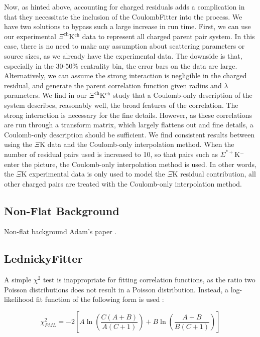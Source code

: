 \documentclass[ALICE,manyauthors]{cernphprep}
\begin{document}
Now, as hinted above, accounting for charged residuals adds a complication in that they necessitate the inclusion of the CoulombFitter into the process.  We have two solutions to bypass such a large increase in run time.  First, we can use our experimental $\Xi^{\mathrm{ch}}$K$^{\mathrm{ch}}$ data to represent all charged parent pair system.  In this case, there is no need to make any assumption about scattering parameters or source sizes, as we already have the experimental data.  The downside is that, especially in the 30-50\% centrality bin, the error bars on the data are large.  Alternatively, we can assume the strong interaction is negligible in the charged residual, and generate the parent correlation function given radius and $\lambda$ parameters.  We find in our $\Xi^{\mathrm{ch}}$K$^{\mathrm{ch}}$ study that a Coulomb-only description of the system describes, reasonably well, the broad features of the correlation.  The strong interaction is necessary for the fine details.  However, as these correlations are run through a transform matrix, which largely flattens out and fine details, a Coulomb-only description should be sufficient.  We find consistent results between using the $\Xi$K data and the Coulomb-only interpolation method.  When the number of residual pairs used is increased to 10, so that pairs such as $\Sigma^{*+}$K$^{-}$ enter the picture, the Coulomb-only interpolation method is used.  In other words, the $\Xi$K experimental data is only used to model the $\Xi$K residual contribution, all other charged pairs are treated with the Coulomb-only interpolation method.


\subsection{Non-Flat Background}
\label{NonFlatBackground}


Non-flat background
Adam's paper \cite{Kisiel:2017}.




\subsection{LednickyFitter}
\label{LednickyFitter}


A simple $\chi^{2}$ test is inappropriate for fitting correlation functions, as the ratio two Poisson distributions does not result in a Poisson distribution.
Instead, a log-likelihood fit function of the following form is used \cite{Lisa:2005dd}:

\begin{equation}
 \chi^{2}_{PML} = -2\left[A\ln\left(\frac{C(A+B)}{A(C+1)}\right) + B\ln\left(\frac{A+B}{B(C+1)}\right)\right]
\label{eqn:Chi2PML}
\end{equation}
\end{document}
